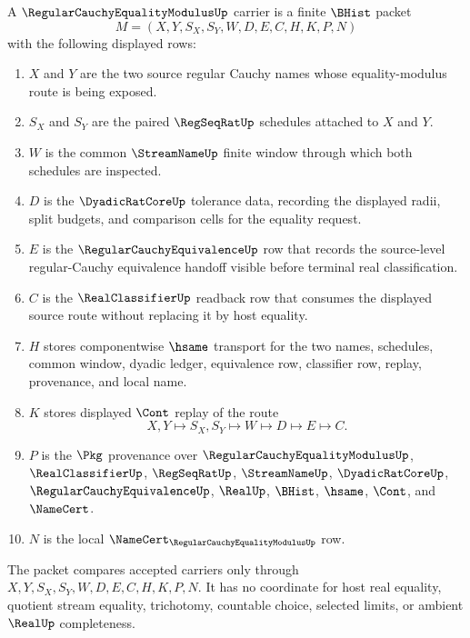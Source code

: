 \begin{definition}
\label{def:regular-cauchy-equality-modulus-carrier}
A $\RegularCauchyEqualityModulusUp$ carrier is a finite $\BHist$ packet
$$
M=(X,Y,S_X,S_Y,W,D,E,C,H,K,P,N)
$$
with the following displayed rows:
\begin{enumerate}
\item $X$ and $Y$ are the two source regular Cauchy names whose equality-modulus route is being exposed.
\item $S_X$ and $S_Y$ are the paired $\RegSeqRatUp$ schedules attached to $X$ and $Y$.
\item $W$ is the common $\StreamNameUp$ finite window through which both schedules are inspected.
\item $D$ is the $\DyadicRatCoreUp$ tolerance data, recording the displayed radii, split budgets, and comparison cells for the equality request.
\item $E$ is the $\RegularCauchyEquivalenceUp$ row that records the source-level regular-Cauchy equivalence handoff visible before terminal real classification.
\item $C$ is the $\RealClassifierUp$ readback row that consumes the displayed source route without replacing it by host equality.
\item $H$ stores componentwise $\hsame$ transport for the two names, schedules, common window, dyadic ledger, equivalence row, classifier row, replay, provenance, and local name.
\item $K$ stores displayed $\Cont$ replay of the route
$$
X,Y \longmapsto S_X,S_Y \longmapsto W \longmapsto D \longmapsto E \longmapsto C .
$$
\item $P$ is the $\Pkg$ provenance over $\RegularCauchyEqualityModulusUp$, $\RealClassifierUp$, $\RegSeqRatUp$, $\StreamNameUp$, $\DyadicRatCoreUp$, $\RegularCauchyEquivalenceUp$, $\RealUp$, $\BHist$, $\hsame$, $\Cont$, and $\NameCert$.
\item $N$ is the local $\NameCert_{\RegularCauchyEqualityModulusUp}$ row.
\end{enumerate}
The packet compares accepted carriers only through $X,Y,S_X,S_Y,W,D,E,C,H,K,P,N$. It has no coordinate for host real equality, quotient stream equality, trichotomy, countable choice, selected limits, or ambient $\RealUp$ completeness.
\end{definition}

